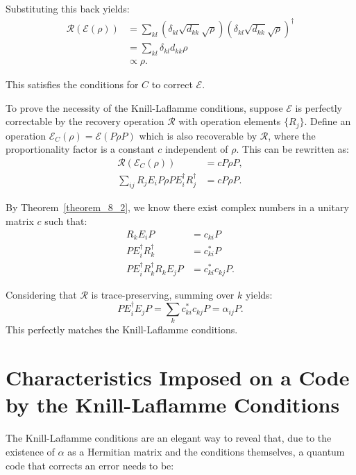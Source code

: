 Substituting this back yields:
\begin{align*}
\mathcal{R}(\mathcal{E}(\rho)) &=\sum_{kl} \left(\delta_{kl} \sqrt{d_{kk}} \sqrt{\rho}\right) \left(\delta_{kl} \sqrt{d_{kk}} \sqrt{\rho}\right)^\dagger\\
&=\sum_{kl} \delta_{kl} d_{kk} \rho\\
&\propto \rho
.\end{align*}

This satisfies the conditions for $C$ to correct $\mathcal{E}$.

To prove the necessity of the Knill-Laflamme conditions, suppose $\mathcal{E}$ is perfectly correctable by the recovery operation $\mathcal{R}$ with operation elements $\{R_j\}$. Define an operation $\mathcal{E}_C (\rho) = \mathcal{E}(P\rho P)$ which is also recoverable by $\mathcal{R}$, where the proportionality factor is a constant $c$ independent of $\rho$. This can be rewritten as:
\begin{align*}
\mathcal{R}(\mathcal{E}_C(\rho)) &= c P\rho P,\\
\sum_{ij} R_j E_i P \rho P E^\dagger_i R^\dagger_j &= c P \rho P
.\end{align*}

By Theorem~\ref{theorem_8_2}, we know there exist complex numbers in a unitary matrix $c$ such that:
\begin{align*}
R_k E_i P &= c_{ki} P\\
P E_i^\dagger R_k^\dagger &= c_{ki}^* P\\
P E_i^\dagger R_k^\dagger R_k E_j P &= c_{ki}^* c_{kj} P
.\end{align*}

Considering that $\mathcal{R}$ is trace-preserving, summing over $k$ yields:
\begin{equation}
P E_i^\dagger E_j P = \sum_k c_{ki}^* c_{kj} P = \alpha_{ij} P
.\end{equation}
This perfectly matches the Knill-Laflamme conditions.

\section{Characteristics Imposed on a Code by the Knill-Laflamme Conditions}

The Knill-Laflamme conditions are an elegant way to reveal that, due to the existence of $\alpha$ as a Hermitian matrix and the conditions themselves, a quantum code that corrects an error needs to be:

